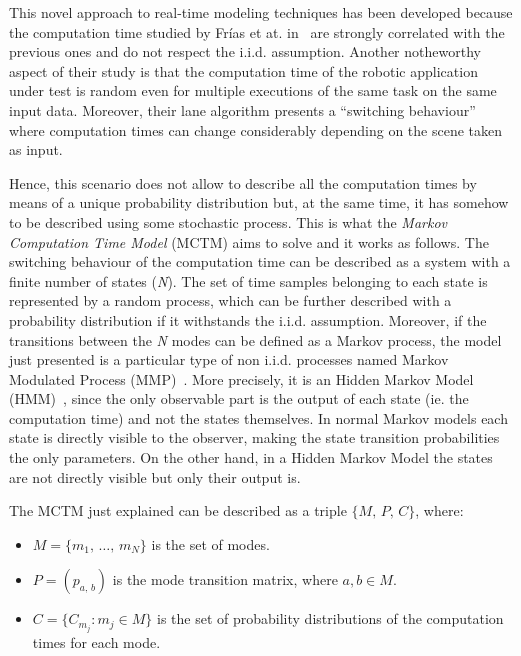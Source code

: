 This novel approach to real-time modeling techniques has been developed because the
computation time studied by Fr\'{i}as et at. in~\cite{frias2017probabilistic}
are strongly correlated with the previous ones and do not respect the i.i.d.
assumption. Another notheworthy aspect of their study is that the
computation time of the robotic application under test is random even for multiple
executions of the same task on the same input data.
Moreover, their lane algorithm presents a ``switching behaviour'' where computation
times can change considerably depending on the scene taken as input.

Hence, this scenario does not allow to describe all the computation times by means
of a unique probability distribution but, at the same time, it has somehow to be described
using some stochastic process. This is what the \emph{Markov Computation Time Model}
(MCTM) aims to solve and it works as follows. The switching behaviour of the
computation time can be described as a system with a finite number of states
(\emph{N}). The set of time samples belonging to each state is represented
by a random process, which can be further described with a probability
distribution if it withstands the i.i.d. assumption.
Moreover, if the transitions between the \emph{N} modes can be defined as a Markov
process, the model just presented is a particular type of non i.i.d. processes
named Markov Modulated Process (MMP)~\cite{fischer1993markov}.
More precisely, it is an Hidden Markov Model (HMM)~\cite{eddy1996hidden}, since
the only observable part is the output of each state (ie. the computation time)
and not the states themselves. In normal Markov models each
state is directly visible to the observer, making the state transition probabilities
the only parameters. On the other hand, in a Hidden Markov Model the states are
not directly visible but only their output is.

The MCTM just explained can be described as a triple \(\{M,\,P,\,C\}\), where:
\begin{itemize}
    \item \( M = \{ m_1,\,\dots,\,m_N \} \) is the set of modes.
    \item \( P = (p_{a,\,b}) \) is the mode transition matrix, where
        \(a, b \in M\).
    \item \( C = \{ C_{m_j} : m_j \in M \} \) is the set of probability
        distributions of the computation times for each mode.
\end{itemize}

